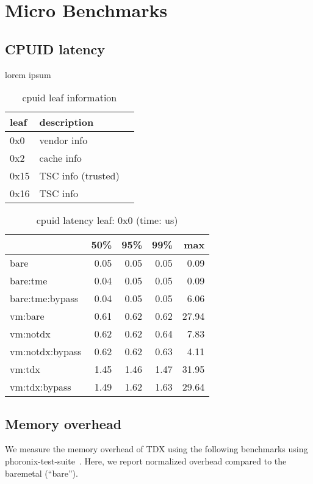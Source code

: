 \documentclass[letterpaper,twocolumn,10pt]{article}
\begin{document}
\section{Micro Benchmarks}
\subsection{CPUID latency}
lorem ipsum


\begin{table}
\centering
\caption{cpuid leaf information}
\label{tab:cpuid}
\begin{tabular}{lll}
\toprule
leaf &  description &  \\
\midrule
0x0  & vendor info  \\
0x2  & cache info   \\
0x15 & TSC info (trusted)    \\
0x16 & TSC info     \\
\bottomrule
\end{tabular}
\end{table}

\begin{table}
\centering
\caption{cpuid latency leaf: 0x0 (time: us)}
\label{tab:cpuid_0x0}
\begin{tabular}{lrrrr}
\toprule
{} &  50\% &  95\% &  99\% &   max \\
\midrule
bare            & 0.05 & 0.05 & 0.05 &  0.09 \\
bare:tme        & 0.04 & 0.05 & 0.05 &  0.09 \\
bare:tme:bypass & 0.04 & 0.05 & 0.05 &  6.06 \\
vm:bare         & 0.61 & 0.62 & 0.62 & 27.94 \\
vm:notdx        & 0.62 & 0.62 & 0.64 &  7.83 \\
vm:notdx:bypass & 0.62 & 0.62 & 0.63 &  4.11 \\
vm:tdx          & 1.45 & 1.46 & 1.47 & 31.95 \\
vm:tdx:bypass   & 1.49 & 1.62 & 1.63 & 29.64 \\
\bottomrule
\end{tabular}
\end{table}

\subsection{Memory overhead}
We measure the memory overhead of TDX using the following benchmarks using phoronix-test-suite~\cite{phoronix}.
Here, we report normalized overhead compared to the baremetal (``bare'').
\end{document}
